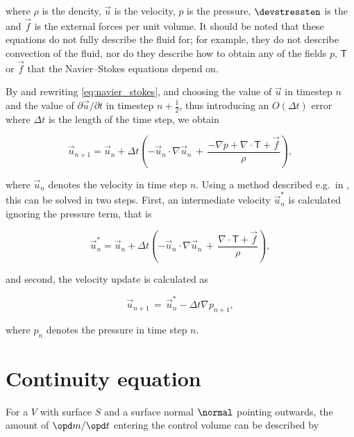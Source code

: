 where $\rho$ is the dencity, $\vec{u}$ is the velocity, $p$ is the pressure, $\devstressten$ is the  and $\vec{f}$ is the external forces per unit volume. It should be noted that these equations do not fully describe the fluid for; for example, they do not describe convection of the fluid, nor do they describe how to obtain any of the fields $p$, $\boldsymbol{\mathsf{T}}$ or $\vec{f}$ that the Navier--Stokes equations depend on.

By  and rewriting \eqref{eq:navier_stokes}, and choosing the value of $\vec{u}$ in timestep $n$ and the value of $\partial\vec{u}/\partial t$ in timestep $n+\frac{1}{2}$, thus introducing an $O(\Delta t)$ error where $\Delta t$ is the length of the time step, we obtain

\begin{equation} \label{eq:navier_stokes_time_discretized}
\vec{u}_{n+1}  = \vec{u}_{n} + \Delta t\left(-\vec{u}_{n}\cdot\nabla\vec{u}_{n} \,+\, \frac{-\nabla p + \nabla\cdot\boldsymbol{\mathsf{T}} + \vec{f}}{\rho}\right),
\end{equation}

where $\vec{u}_{n}$ denotes the velocity in time step $n$. Using a method described e.g.\ in \citep{Losasso2004}, this \PDE can be solved in two steps. First, an intermediate velocity $\vec{u}^*_n$ is calculated ignoring the pressure term, that is

\begin{equation} \label{eq:intermediate_velocity}
\vec{u}^*_n  = \vec{u}_{n} + \Delta t\left(-\vec{u}_{n}\cdot\nabla\vec{u}_{n} \,+\, \frac{\nabla\cdot\boldsymbol{\mathsf{T}} + \vec{f}}{\rho}\right),
\end{equation}

and second, the velocity update is calculated as

\begin{equation} \label{eq:velocity_update}
\vec{u}_{n+1} \,=\, \vec{u}^*_n - \Delta t\nabla p_{n+1},
\end{equation}

where $p_n$ denotes the pressure in time step $n$.

\section{Continuity equation}

For a  $V$ with surface $S$ and a surface normal $\normal$ pointing outwards, the amount of  $\opd m/\opd t$ entering the control volume can be described by

